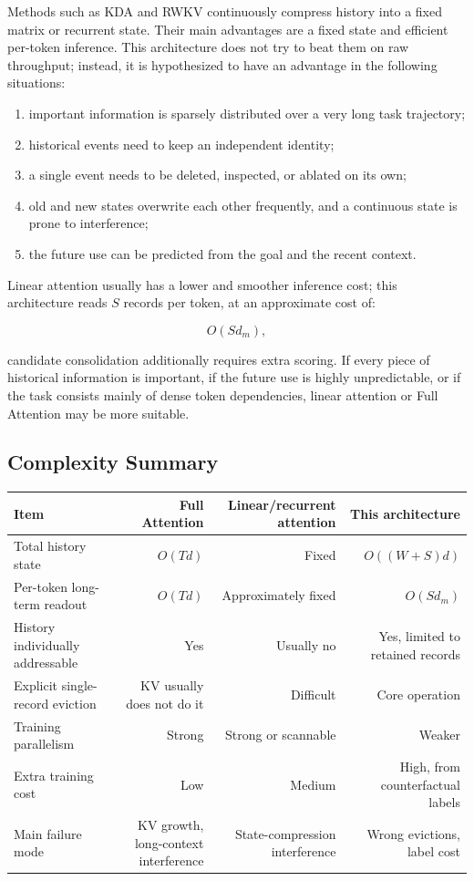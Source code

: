 Methods such as KDA and RWKV continuously compress history into a fixed matrix or recurrent state. Their main advantages are a fixed state and efficient per-token inference. This architecture does not try to beat them on raw throughput; instead, it is hypothesized to have an advantage in the following situations:

\begin{enumerate}
  \item important information is sparsely distributed over a very long task trajectory;
  \item historical events need to keep an independent identity;
  \item a single event needs to be deleted, inspected, or ablated on its own;
  \item old and new states overwrite each other frequently, and a continuous state is prone to interference;
  \item the future use can be predicted from the goal and the recent context.
\end{enumerate}

Linear attention usually has a lower and smoother inference cost; this architecture reads $S$ records per token, at an approximate cost of:

\[
O(Sd_m),
\]

candidate consolidation additionally requires extra scoring. If every piece of historical information is important, if the future use is highly unpredictable, or if the task consists mainly of dense token dependencies, linear attention or Full Attention may be more suitable.

\subsection{Complexity Summary}

\begin{table}[htbp]\centering
\begin{tabular}{lrrr}\toprule
Item & Full Attention & Linear/recurrent attention & This architecture \\
\midrule
Total history state & $O(Td)$ & Fixed & $O((W+S)d)$ \\
Per-token long-term readout & $O(Td)$ & Approximately fixed & $O(Sd_m)$ \\
History individually addressable & Yes & Usually no & Yes, limited to retained records \\
Explicit single-record eviction & KV usually does not do it & Difficult & Core operation \\
Training parallelism & Strong & Strong or scannable & Weaker \\
Extra training cost & Low & Medium & High, from counterfactual labels \\
Main failure mode & KV growth, long-context interference & State-compression interference & Wrong evictions, label cost \\
\bottomrule
\end{tabular}
\end{table}

